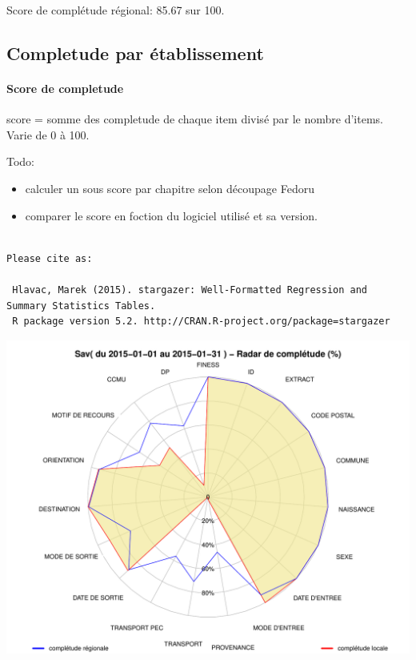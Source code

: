 \documentclass[]{article}
\begin{document}
Score de complétude régional: 85.67 sur 100.

\subsection{Completude par
établissement}\label{completude-par-etablissement}

\paragraph{Score de completude}\label{score-de-completude}

score = somme des completude de chaque item divisé par le nombre
d'items. Varie de 0 à 100.

Todo:

\begin{itemize}
\itemsep1pt\parskip0pt
\item
  calculer un sous score par chapitre selon découpage Fedoru
\item
  comparer le score en foction du logiciel utilisé et sa version.
\end{itemize}

\begin{verbatim}

Please cite as: 

 Hlavac, Marek (2015). stargazer: Well-Formatted Regression and Summary Statistics Tables.
 R package version 5.2. http://CRAN.R-project.org/package=stargazer 
\end{verbatim}

\includegraphics{completude_files/figure-latex/finess-1.pdf}
\end{document}
